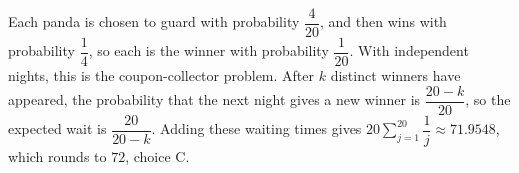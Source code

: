 Each panda is chosen to guard with probability $\dfrac{4}{20}$, and then wins with probability $\dfrac{1}{4}$, so each is the winner with probability $\dfrac{1}{20}$. With independent nights, this is the coupon-collector problem. After $k$ distinct winners have appeared, the probability that the next night gives a new winner is $\dfrac{20-k}{20}$, so the expected wait is $\dfrac{20}{20-k}$. Adding these waiting times gives $20\sum_{j=1}^{20}\dfrac{1}{j}\approx71.9548$, which rounds to $\boxed{72}$, choice C.
